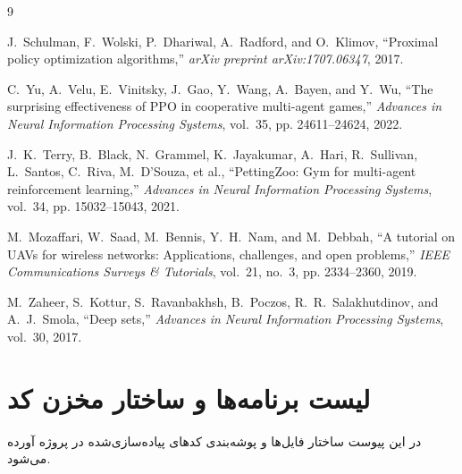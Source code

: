 \documentclass[a4paper,12pt,oneside]{report}
\begin{document}
\newpage
\begin{thebibliography}{9}
\begin{LTRitems}

J.~Schulman, F.~Wolski, P.~Dhariwal, A.~Radford, and O.~Klimov, ``Proximal policy optimization algorithms,'' \emph{arXiv preprint arXiv:1707.06347}, 2017.

C.~Yu, A.~Velu, E.~Vinitsky, J.~Gao, Y.~Wang, A.~Bayen, and Y.~Wu, ``The surprising effectiveness of PPO in cooperative multi-agent games,'' \emph{Advances in Neural Information Processing Systems}, vol.~35, pp. 24611--24624, 2022.

J.~K.~Terry, B.~Black, N.~Grammel, K.~Jayakumar, A.~Hari, R.~Sullivan, L.~Santos, C.~Riva, M.~D'Souza, et al., ``PettingZoo: Gym for multi-agent reinforcement learning,'' \emph{Advances in Neural Information Processing Systems}, vol.~34, pp. 15032--15043, 2021.

M.~Mozaffari, W.~Saad, M.~Bennis, Y.~H.~Nam, and M.~Debbah, ``A tutorial on UAVs for wireless networks: Applications, challenges, and open problems,'' \emph{IEEE Communications Surveys \& Tutorials}, vol.~21, no.~3, pp. 2334--2360, 2019.

M.~Zaheer, S.~Kottur, S.~Ravanbakhsh, B.~Poczos, R.~R.~Salakhutdinov, and A.~J.~Smola, ``Deep sets,'' \emph{Advances in Neural Information Processing Systems}, vol.~30, 2017.

\end{LTRitems}
\end{thebibliography}

\appendix
\chapter{لیست برنامه‌ها و ساختار مخزن کد}
در این پیوست ساختار فایل‌ها و پوشه‌بندی کدهای پیاده‌سازی‌شده در پروژه آورده می‌شود.
\end{document}
